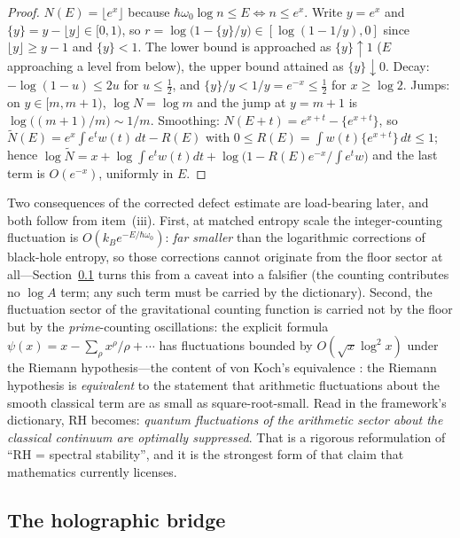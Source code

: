 \documentclass[11pt,a4paper]{article}
\theoremstyle{plain}
\theoremstyle{definition}
\theoremstyle{remark}
\begin{document}
\begin{proof}
$N(E)=\lfloor e^{x}\rfloor$ because $\hbar\omega_{0}\log n\leq E\iff n\leq e^{x}$. Write
$y=e^{x}$ and $\{y\}=y-\lfloor y\rfloor\in[0,1)$, so $r=\log\bigl(1-\{y\}/y\bigr)\in[\log(1-1/y),0]$
since $\lfloor y\rfloor\geq y-1$ and $\{y\}<1$. The lower bound is approached as $\{y\}\uparrow1$
($E$ approaching a level from below), the upper bound attained as $\{y\}\downarrow0$. Decay:
$-\log(1-u)\leq2u$ for $u\leq\tfrac12$, and $\{y\}/y<1/y=e^{-x}\leq\tfrac12$ for $x\geq\log2$.
Jumps: on $y\in[m,m+1)$, $\log N=\log m$ and the jump at $y=m+1$ is
$\log\bigl((m+1)/m\bigr)\sim1/m$. Smoothing: $N(E+t)=e^{x+t}-\{e^{x+t}\}$, so
$\widetilde N(E)=e^{x}\int e^{t}w(t)\,dt-R(E)$ with $0\leq R(E)=\int w(t)\{e^{x+t}\}\,dt\leq1$;
hence $\log\widetilde N=x+\log\int e^{t}w(t)dt+\log\bigl(1-R(E)e^{-x}/\!\int e^{t}w\bigr)$ and
the last term is $O(e^{-x})$, uniformly in $E$.
\end{proof}

Two consequences of the corrected defect estimate are load-bearing later, and both follow
from item~(iii). First, at matched entropy scale the integer-counting fluctuation is
$O(k_{B}e^{-E/\hbar\omega_{0}})$: \emph{far smaller} than the logarithmic corrections of
black-hole entropy, so those corrections cannot originate from the floor sector at
all---Section~\ref{sec:holography} turns this from a caveat into a falsifier (the counting
contributes no $\log A$ term; any such term must be carried by the dictionary). Second, the
fluctuation sector of the gravitational counting function is carried not by the floor but by
the \emph{prime}-counting oscillations: the explicit formula
$\psi(x)=x-\sum_{\rho}x^{\rho}/\rho+\cdots$ has fluctuations bounded by $O(\sqrt x\log^{2}x)$
under the Riemann hypothesis---the content of von Koch's equivalence
\cite{vonkoch1901}: the Riemann hypothesis is \emph{equivalent} to the statement that
arithmetic fluctuations about the smooth classical term are as small as
square-root-small. Read in the framework's dictionary, RH becomes: \emph{quantum
fluctuations of the arithmetic sector about the classical continuum are optimally
suppressed}. That is a rigorous reformulation of ``RH = spectral
stability'', and it is the strongest form of that claim that mathematics currently
licenses.

\subsection{The holographic bridge}\label{sec:holography}
\end{document}
